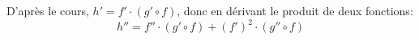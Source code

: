  D’après le cours, $h'=f' \cdot (g' \circ f)$, donc en dérivant le produit de deux fonctions:
\[
h''=f''\cdot (g' \circ f) + (f')^2 \cdot (g'' \circ f) 
\]
